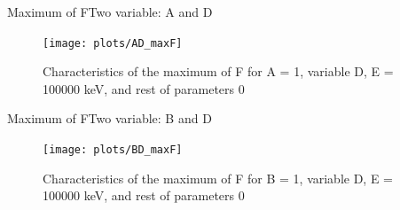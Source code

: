 \documentclass{beamer}
\begin{document}
\begin{frame}{Maximum of F}{Two variable: A and D}
	\begin{figure}
		\centering
		\texttt{[image: plots/AD\_maxF]}
		\caption{Characteristics of the maximum of F for A = 1, variable D, E = 100000 keV, and rest of parameters 0}
	\end{figure}
\end{frame}
\begin{frame}{Maximum of F}{Two variable: B and D}
	\begin{figure}
		\centering
		\texttt{[image: plots/BD\_maxF]}
		\caption{Characteristics of the maximum of F for B = 1, variable D, E = 100000 keV, and rest of parameters 0}
	\end{figure}
\end{frame}
\end{document}
